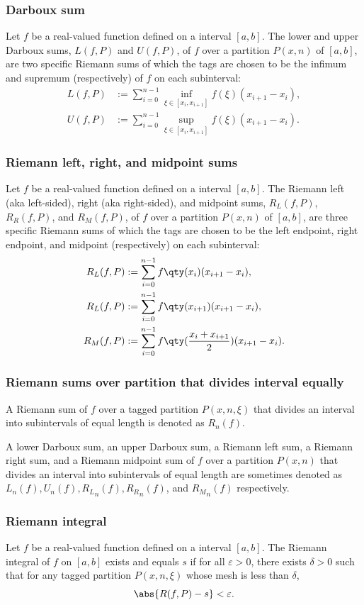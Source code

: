 \documentclass[a4paper,12pt]{report}
\begin{document}
\begin{itemize}
\begin{itemize}
\subsubsection{Darboux sum}
Let $f$ be a real-valued function defined on a interval $[a,b]$. The lower and upper Darboux sums, $L(f,P)$ and $U(f,P)$, of $f$ over a partition $P(x,n)$ of $[a,b]$, are two specific Riemann sums of which the tags are chosen to be the infimum and supremum (respectively) of $f$ on each subinterval:
\[\begin{aligned}
L(f,P)&:=\sum_{i=0}^{n-1}\inf_{\xi\in [x_i,x_{i+1}]}f(\xi)(x_{i+1}-x_i),\\
U(f,P)&:=\sum_{i=0}^{n-1}\sup_{\xi\in [x_i,x_{i+1}]}f(\xi)(x_{i+1}-x_i).
\end{aligned}\]
\subsubsection{Riemann left, right, and midpoint sums}
Let $f$ be a real-valued function defined on a interval $[a,b]$. The Riemann left (aka left-sided), right (aka right-sided), and midpoint sums, $R_L(f,P)$, $R_R(f,P)$, and $R_M(f,P)$, of $f$ over a partition $P(x,n)$ of $[a,b]$, are three specific Riemann sums of which the tags are chosen to be the left endpoint, right endpoint, and midpoint (respectively) on each subinterval:
\[\begin{aligned}
R_L(f,P)&:=\sum_{i=0}^{n-1}f\qty(x_i)(x_{i+1}-x_i),\\
R_L(f,P)&:=\sum_{i=0}^{n-1}f\qty(x_{i+1})(x_{i+1}-x_i),\\
R_M(f,P)&:=\sum_{i=0}^{n-1}f\qty(\frac{x_i+x_{i+1}}{2})(x_{i+1}-x_i).
\end{aligned}\]
\subsubsection{Riemann sums over partition that divides interval equally}
A Riemann sum of $f$ over a tagged partition $P(x,n,\xi)$ that divides an interval into subintervals of equal length is denoted as $R_n(f)$.

A lower Darboux sum, an upper Darboux sum, a Riemann left sum, a Riemann right sum, and a Riemann midpoint sum of $f$ over a partition $P(x,n)$ that divides an interval into subintervals of equal length are sometimes denoted as $L_n(f),U_n(f),{R_L}_n(f),{R_R}_n(f)$, and ${R_M}_n(f)$ respectively.
\subsubsection{Riemann integral}
Let $f$ be a real-valued function defined on a interval $[a,b]$. The Riemann integral of $f$ on $[a,b]$ exists and equals $s$ if for all $\varepsilon > 0$, there exists $\delta > 0$ such that for any tagged partition $P(x,n,\xi)$ whose mesh is less than $\delta$,
\[\abs{R(f,P)-s}<\varepsilon .\]

\end{itemize}
\end{itemize}
\end{document}
